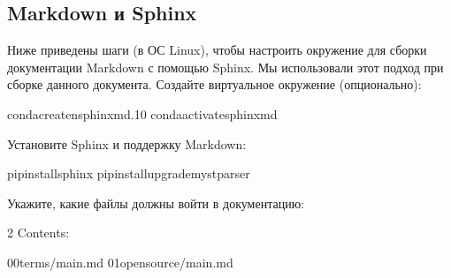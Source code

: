 \documentclass[letterpaper,10pt,russian]{sphinxmanual}
\begin{document}
\subsection{Markdown и Sphinx}
\label{\detokenize{educational_materials/docs/content:markdown-sphinx}}
\sphinxAtStartPar
Ниже приведены шаги (в ОС Linux), чтобы настроить окружение для сборки документации Markdown с помощью Sphinx. Мы использовали этот подход при сборке данного документа. Создайте виртуальное окружение (опционально):

\begin{sphinxVerbatim}[commandchars=\\\{\}]
condacreate\PYGZhy{}nsphinx\PYGZus{}md.10
condaactivatesphinx\PYGZus{}md
\end{sphinxVerbatim}

\sphinxAtStartPar
Установите Sphinx и поддержку Markdown:

\begin{sphinxVerbatim}[commandchars=\\\{\}]
pipinstallsphinx
pipinstall\PYGZhy{}\PYGZhy{}upgrademyst\PYGZhy{}parser
\end{sphinxVerbatim}

\sphinxAtStartPar
Укажите, какие файлы должны войти в документацию:

\begin{sphinxVerbatim}[commandchars=\\\{\}]


 
   2
   Contents:

  00\PYGZus{}terms/main.md
  01\PYGZus{}open\PYGZus{}source/main.md
  

 
 
 
\end{sphinxVerbatim}
\end{document}
